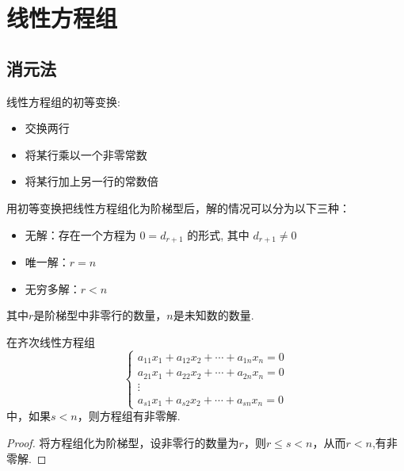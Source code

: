 \chapter{线性方程组}
\section{消元法}
\begin{definition}
    线性方程组的初等变换:
    \begin{itemize}
        \item 交换两行
        \item 将某行乘以一个非零常数
        \item 将某行加上另一行的常数倍
    \end{itemize}
\end{definition}
用初等变换把线性方程组化为阶梯型后，解的情况可以分为以下三种：
\begin{itemize}
    \item 无解：存在一个方程为 $0=d_{r+1}$ 的形式, 其中 $d_{r+1} \neq 0$
    \item 唯一解：$r=n$
    \item 无穷多解：$r<n$
\end{itemize}
其中$r$是阶梯型中非零行的数量，$n$是未知数的数量.
\begin{theorem}
    在齐次线性方程组
    \begin{equation*}
    \begin{cases}
        a_{11}x_1 + a_{12}x_2 + \cdots + a_{1n}x_n = 0 \\
        a_{21}x_1 + a_{22}x_2 + \cdots + a_{2n}x_n = 0 \\
        \vdots \\
        a_{s1}x_1 + a_{s2}x_2 + \cdots + a_{sn}x_n = 0
    \end{cases}
    \end{equation*}
    中，如果$s<n$，则方程组有非零解.
\end{theorem}
\begin{proof}
    将方程组化为阶梯型，设非零行的数量为$r$，则$r \leq s < n$，从而$r<n$,有非零解.
\end{proof}

